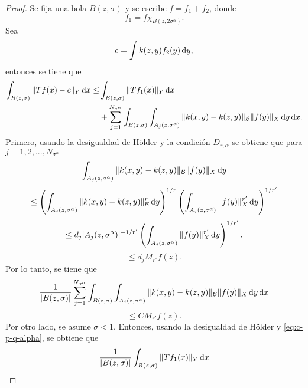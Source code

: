 \begin{proof}
	Se fija una bola $B(z, \sigma)$ y se escribe $f=f_1+f_2$, donde 
	\begin{equation*}
		f_1 = f\chi_{B(z, 2\sigma^\alpha)}.
	\end{equation*}
	Sea
	\begin{equation*}
		c = \int k(z, y)f_2(y)\mathop{}\!\mathrm{d} y,
	\end{equation*}
	entonces se tiene que
	\begin{align*}
		\int_{B(z, \sigma)} \|Tf(x)-c\|_Y \mathop{}\!\mathrm{d} x \leq & \int_{B(z, \sigma)} \|Tf_1(x)\|_Y \mathop{}\!\mathrm{d} x \\
		& + \sum_{j=1}^{N_{\sigma^\alpha}} \int_{B(z, \sigma)}\int_{A_j(z, \sigma^\alpha)} \|k(x,y)-k(z,y)\|_\mathcal{B}\|f(y)\|_X \mathop{}\!\mathrm{d} y \mathop{}\!\mathrm{d} x .
	\end{align*}
	Primero, usando la desigualdad de H\"older y la condición $D_{r, \alpha}$ se obtiene que para $j=1,2,...,N_{\sigma^\alpha}$
	\begin{equation*}
		\int_{A_j(z, \sigma^\alpha)} \|k(x,y)-k(z,y)\|_\mathcal{B}\|f(y)\|_X \mathop{}\!\mathrm{d} y 
	\end{equation*}
	\begin{equation*}
		\leq\left( \int_{A_j(z, \sigma^\alpha)} \|k(x,y)-k(z,y)\|_\mathcal{B}^r \mathop{}\!\mathrm{d} y \right)^{1/r}\left(  \int_{A_j(z,\sigma^\alpha)}  \|f(y)\|_X^{r'} \mathop{}\!\mathrm{d} y \right)^{1/r'}
	\end{equation*}
	\begin{equation*}
		\leq  d_j |A_j(z,\sigma^\alpha)|^{-1/r'}\left(  \int_{A_j(z,\sigma^\alpha)}  \|f(y)\|_X^{r'} \mathop{}\!\mathrm{d} y \right)^{1/r'}.
	\end{equation*}
	\begin{equation*}
		\leq d_j M_{r'}f(z).
	\end{equation*}
	Por lo tanto, se tiene que 
	\begin{equation*}
		\frac{1}{|B(z,\sigma)|}\sum_{j=1}^{N_{\sigma^\alpha}} \int_{B(z,\sigma)}\int_{A_j(z, \sigma^\alpha)} \|k(x,y)-k(z,y)\|_\mathcal{B}\|f(y)\|_X \mathop{}\!\mathrm{d} y \mathop{}\!\mathrm{d} x
	\end{equation*}
	\begin{equation*}
		\leq CM_{r'}f(z).
	\end{equation*}
	Por otro lado, se asume $\sigma<1$. Entonces, usando la desigualdad de H\"older y \cref{eq:c-p-q-alpha}, se obtiene que
	\begin{equation*}
		\frac{1}{|B(z,\sigma)|}\int_{B(z, \sigma)}\|Tf_1(x)\|_Y \mathop{}\!\mathrm{d} x 
	\end{equation*}
	\begin{equation*}

\end{equation*}
\end{proof}
